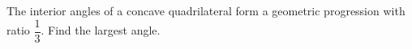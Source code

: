 The interior angles of a concave quadrilateral form a geometric progression with ratio $\dfrac{1}{3}$. Find the largest angle.
